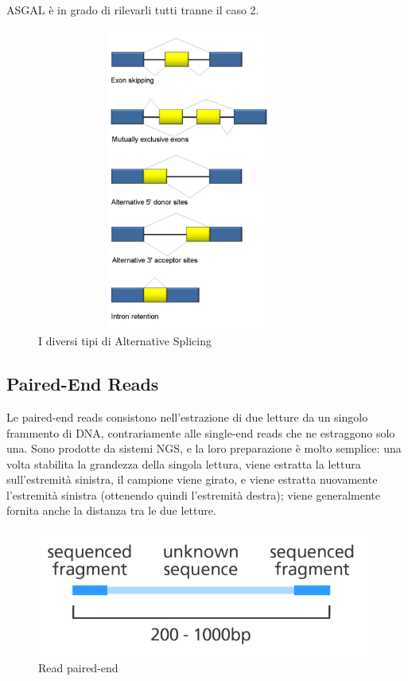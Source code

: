 ASGAL è in grado di rilevarli tutti tranne il caso 2.

\newpage

\begin{figure}[t!]
	\centering
	\includegraphics[height=10cm,width=10cm]{images/alternativesplicingevents.jpg}
  \caption{I diversi tipi di Alternative Splicing}
  \label{fig:AlternativeSplicingTypes}
\end{figure}

\subsection{Paired-End Reads}
Le paired-end reads consistono nell'estrazione di due letture da un singolo frammento di DNA, contrariamente alle single-end reads che ne estraggono solo una. Sono prodotte da sistemi NGS, e la loro preparazione è molto semplice: una volta stabilita la grandezza della singola lettura, viene estratta la lettura sull'estremità sinistra, il campione viene girato, e viene estratta nuovamente l'estremità sinistra (ottenendo quindi l'estremità destra); viene generalmente fornita anche la distanza tra le due letture.

\begin{figure}[h!]
	\centering
	\includegraphics{images/pairedendreads2.png}
  \caption{Read paired-end}
  \label{fig:PairedEndReads}
\end{figure}